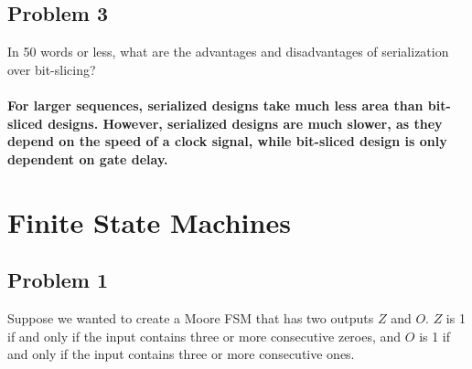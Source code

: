 \documentclass{article}
\begin{document}
\subsection*{Problem 3}
In 50 words or less, what are the advantages and disadvantages of serialization over bit-slicing?\\ 
\\ \textbf{For larger sequences, serialized designs take much less area than bit-sliced designs. However, serialized designs are much slower, as they depend on the speed of a clock signal, while bit-sliced design is only dependent on gate delay. }


\newpage
\section*{Finite State Machines}
\subsection*{Problem 1}

Suppose we wanted to create a Moore FSM that has two outputs $Z$ and $O$. $Z$ is 1 if and only if the input contains three or more consecutive zeroes, and $O$ is 1 if and only if the input contains three or more consecutive ones.
\end{document}
